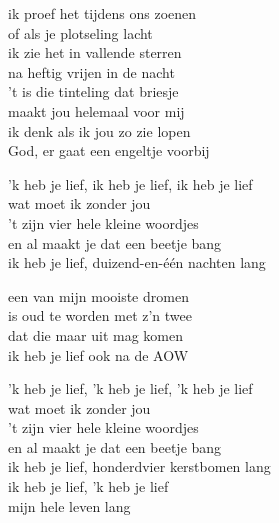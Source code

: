 ik proef het tijdens ons zoenen\\
of als je plotseling lacht\\
ik zie het in vallende sterren\\
na heftig vrijen in de nacht\\
't is die tinteling dat briesje\\
maakt jou helemaal voor mij\\
ik denk als ik jou zo zie lopen\\
God, er gaat een engeltje voorbij

'k heb je lief, ik heb je lief, ik heb je lief\\
wat moet ik zonder jou\\
't zijn vier hele kleine woordjes\\
en al maakt je dat een beetje bang\\
ik heb je lief, duizend-en-één nachten lang

een van mijn mooiste dromen\\
is oud te worden met z'n twee\\
dat die maar uit mag komen\\
ik heb je lief ook na de AOW

'k heb je lief, 'k heb je lief, 'k heb je lief\\
wat moet ik zonder jou\\
't zijn vier hele kleine woordjes\\
en al maakt je dat een beetje bang\\
ik heb je lief, honderdvier kerstbomen lang\\
ik heb je lief, 'k heb je lief\\
mijn hele leven lang

